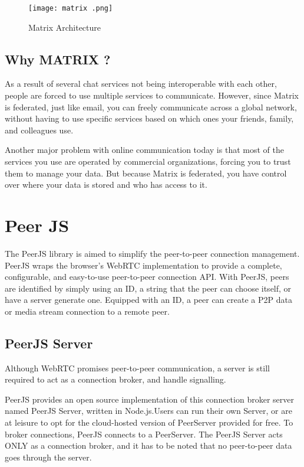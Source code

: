 \begin{figure}
    \begin{center}
        \texttt{[image: matrix .png]}
    \end{center}
    \caption{Matrix Architecture}
    \label{fig:matrix}
\end{figure}

\subsection{Why MATRIX ?}

As a result of several chat services not being interoperable with each other, people are 
forced to use multiple services to communicate.
However, since Matrix is federated, just like email, you can freely communicate across a 
global network, without having to use specific services based on which ones your friends, 
family, and colleagues use.
 
Another major problem with online communication today is that most of the services you
use are operated by commercial organizations, forcing you to trust them to manage your data.
But because Matrix is federated, you have control over where your data is stored and who has access to it. 

\section{Peer JS}

The PeerJS library is aimed to simplify the peer-to-peer connection management. 
PeerJS wraps the browser's WebRTC implementation to provide a complete, configurable,
 and easy-to-use peer-to-peer connection API. 
With PeerJS, peers are identified by simply using an ID, a string that the peer
 can choose itself, or have a server generate one. 
Equipped with an ID, a peer can create a P2P data or media stream connection to a remote peer.

\subsection{PeerJS Server}

Although WebRTC promises peer-to-peer communication, a server is still required to 
act as a connection broker, and handle signalling.
 
PeerJS provides an open source implementation of this connection broker 
server named PeerJS Server, written in Node.js.Users can run their own Server, 
or are at leisure to opt for the cloud-hosted version of PeerServer provided for free.
To broker connections, PeerJS connects to a PeerServer. The PeerJS Server acts ONLY as
 a connection broker, and it has to be noted that no peer-to-peer data goes through the server.
 

